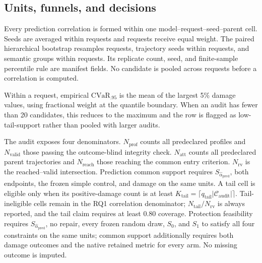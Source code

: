 \subsection{Units, funnels, and decisions}
\label{app:outcomes}

Every prediction correlation is formed within one
model--request--seed--parent cell. Seeds are averaged within requests and
requests receive equal weight. The paired hierarchical bootstrap resamples
requests, trajectory seeds within requests, and semantic groups within
requests. Its replicate count, seed, and
finite-sample percentile rule are manifest fields. No candidate is pooled
across requests before a correlation is computed.

Within a request, empirical $\mathrm{CVaR}_{.95}$ is the mean of the largest
5\% damage values, using fractional weight at the quantile boundary. When an
audit has fewer than 20 candidates, this reduces to the maximum and the row is
flagged as low-tail-support rather than pooled with larger audits.

The audit exposes four denominators. $N_{\mathrm{prof}}$ counts all predeclared
profiles and $N_{\mathrm{valid}}$ those passing the outcome-blind integrity check.
$N_{\mathrm{att}}$ counts all predeclared parent trajectories and $N_{\mathrm{reach}}$
those reaching the common entry criterion. $N_{\mathrm{rv}}$ is the
reached--valid intersection. Prediction common support requires
$S_{\widehat\alpha_{\mathrm{pred}}}$,
both endpoints, the frozen simple control, and damage on the same units. A
tail cell is eligible only when its positive-damage count is at least
$K_{\mathrm{tail}}=\lceil q_{\mathrm{tail}}
|\mathcal C_{\mathrm{audit}}|\rceil$. Tail-ineligible cells remain in
the RQ1 correlation denominator; $N_{\mathrm{tail}}/N_{\mathrm{rv}}$ is always reported,
and the tail claim requires at least 0.80 coverage. Protection feasibility
requires $S_{\widehat\alpha_{\mathrm{pred}}}$, no repair, every frozen random
draw, $S_0$, and $S_1$ to
satisfy all four constraints on the same units; common support additionally
requires both damage outcomes and the native retained metric for every arm.
No missing outcome is imputed.

